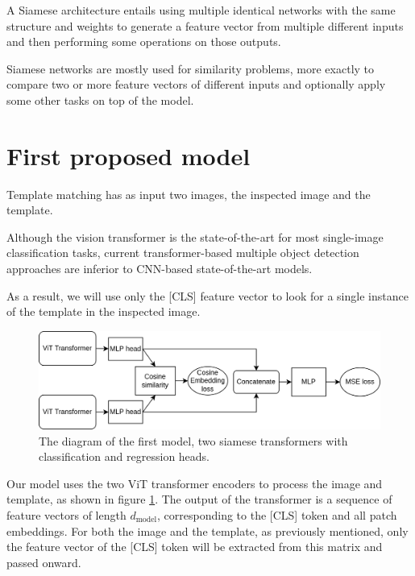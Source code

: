 \documentclass{report}[12pt, a4paper]
\begin{document}
A Siamese architecture entails using multiple identical networks with the same structure and weights to generate a feature vector from multiple different inputs and then performing some operations on those outputs.

Siamese networks are mostly used for similarity problems, more exactly to compare two or more feature vectors of different inputs and optionally apply some other tasks on top of the model.


\section{First proposed model}

Template matching has as input two images, the inspected image and the template.

Although the vision transformer is the state-of-the-art for most single-image classification tasks, current transformer-based multiple object detection approaches are inferior to CNN-based state-of-the-art models.

As a result, we will use only the [CLS] feature vector to look for a single instance of the template in the inspected image.

\begin{figure}[htp]
    \centering
    \includegraphics[width=14cm]{first_approach_diagram}
    \caption{The diagram of the first model, two siamese transformers with classification and regression heads.}
    \label{fig:first_approach_diagram}
\end{figure}

Our model uses the two ViT transformer encoders to process the image and template, as shown in figure \ref{fig:first_approach_diagram}. The output of the transformer is a sequence of feature vectors of length  $d_{\text{model}}$, corresponding to the [CLS] token and all patch embeddings. For both the image and the template, as previously mentioned, only the feature vector of the [CLS] token will be extracted from this matrix and passed onward.
\end{document}
